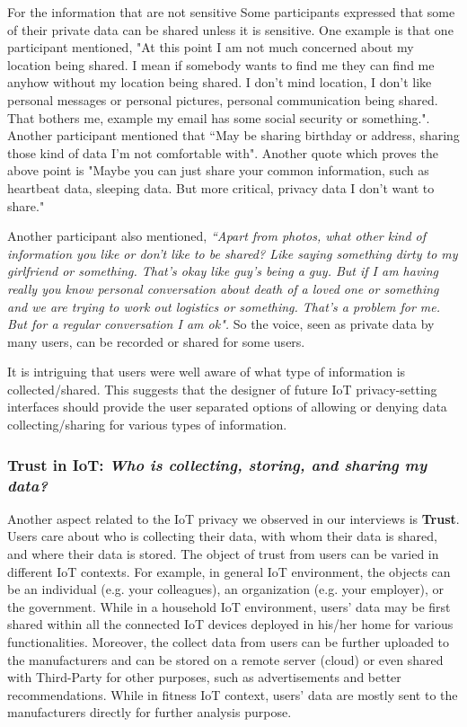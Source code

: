 For the information that are not sensitive
Some participants expressed that some of their private data can be shared unless it is sensitive. One example is that one participant mentioned, "At this point I am not much concerned about my location being shared. I mean if somebody wants to find me they can find me anyhow without my location being shared. I don't mind location, I don't like personal messages or personal pictures, personal communication being shared. That bothers me, example my email has some social security or something.". Another participant mentioned that ``May be sharing birthday or address, sharing those kind of data I'm not comfortable with". Another quote which proves the above point is "Maybe you can just share your common information, such as heartbeat data, sleeping data. But more critical, privacy data I don't want to share."

Another participant also mentioned, \textit {``Apart from photos, what other kind of information you like or don't like to be shared? Like saying something dirty to my girlfriend or something. That's okay like guy's being a guy. But if I am having really you know personal conversation about death of a loved one or something and we are trying to work out logistics or something. That's a problem for me. But for a regular conversation I am ok".} So the voice, seen as private data by many users, can be recorded or shared for some users.

It is intriguing that users were well aware of what type of information is collected/shared. This suggests that the designer of future IoT privacy-setting interfaces should provide the user separated options of allowing or denying data collecting/sharing for various types of information.

\subsubsection{Trust in IoT: \textit{Who is collecting, storing, and sharing my data?}}
Another aspect related to the IoT privacy we observed in our interviews is \textbf{Trust}. Users care about who is collecting their data, with whom their data is shared, and where their data is stored. The object of trust from users can be varied in different IoT contexts. For example, in general IoT environment, the objects can be an individual (e.g. your colleagues), an organization (e.g. your employer), or the government. While in a household IoT environment, users' data may be first shared within all the connected IoT devices deployed in his/her home for various functionalities. Moreover, the collect data from users can be further uploaded to the manufacturers and can be stored on a remote server (cloud) or even shared with Third-Party for other purposes, such as advertisements and better recommendations. While in fitness IoT context, users' data are mostly sent to the manufacturers directly for further analysis purpose.

